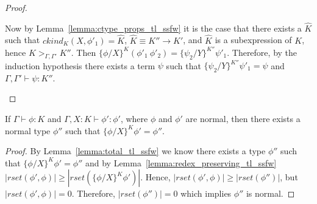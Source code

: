 \begin{proof}
\begin{itemize}
    Now by Lemma~\ref{lemma:ctype_props_tl_ssfw} it is the case that 
    there exists a $\hat{K}$ such that $ckind_K(X,\phi'_1) = \hat{K}$, 
    $\hat{K} \equiv K'' \to K'$, and $\hat{K}$ is a subexpression of $K$, hence
    $K >_{\Gamma,\Gamma'} K''$.
    Then $\{\phi/X\}^K (\phi'_1\ \phi'_2) = \{\psi_2/Y\}^{K''} \psi'_1$.  
    Therefore, by the induction hypothesis there exists a 
    term $\psi$ such that $\{\psi_2/Y\}^{K''} \psi'_1 = \psi$ and $\Gamma,\Gamma' \vdash \psi:K''$.
  \end{itemize}
\end{proof}

\begin{lemma}
  \label{corollary:normalization_preserving_tl_ssfw}
  If $\Gamma \vdash \phi:K$ and $\Gamma, X:K \vdash \phi':\phi'$, where $\phi$ and $\phi'$ are normal, then there exists a normal type $\phi''$ 
  such that $\{\phi/X\}^K \phi' = \phi''$.
\end{lemma}
\begin{proof}
  By Lemma~\ref{lemma:total_tl_ssfw} we know there exists a type $\phi''$ such that $\{\phi/X\}^K \phi' = \phi''$ and by 
  Lemma~\ref{lemma:redex_preserving_tl_ssfw} 
  $|rset(\phi', \phi)| \geq |rset(\{\phi/X\}^K \phi')|$.  Hence, $|rset(\phi', \phi)| \geq |rset(\phi'')|$, but
  $|rset(\phi', \phi)| = 0$.  Therefore, $|rset(\phi'')| = 0$ which implies $\phi''$ is normal.
\end{proof}

